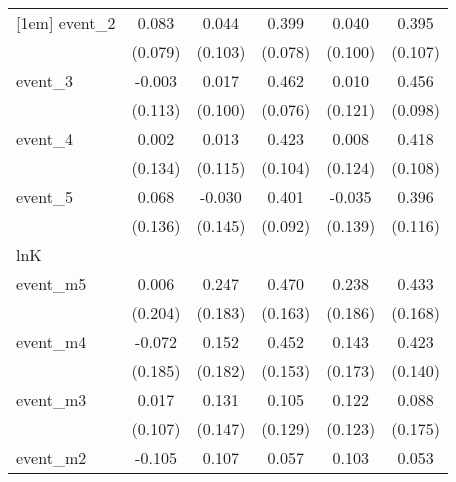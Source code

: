 {\begin{tabular}{l*{5}{c}}
[1em]
event\_2     &       0.083         &       0.044         &       0.399\sym{***}&       0.040         &       0.395\sym{***}\\
            &     (0.079)         &     (0.103)         &     (0.078)         &     (0.100)         &     (0.107)         \\
[1em]
event\_3     &      -0.003         &       0.017         &       0.462\sym{***}&       0.010         &       0.456\sym{***}\\
            &     (0.113)         &     (0.100)         &     (0.076)         &     (0.121)         &     (0.098)         \\
[1em]
event\_4     &       0.002         &       0.013         &       0.423\sym{***}&       0.008         &       0.418\sym{***}\\
            &     (0.134)         &     (0.115)         &     (0.104)         &     (0.124)         &     (0.108)         \\
[1em]
event\_5     &       0.068         &      -0.030         &       0.401\sym{***}&      -0.035         &       0.396\sym{***}\\
            &     (0.136)         &     (0.145)         &     (0.092)         &     (0.139)         &     (0.116)         \\
\hline
lnK         &                     &                     &                     &                     &                     \\
event\_m5    &       0.006         &       0.247         &       0.470\sym{**} &       0.238         &       0.433\sym{*}  \\
            &     (0.204)         &     (0.183)         &     (0.163)         &     (0.186)         &     (0.168)         \\
[1em]
event\_m4    &      -0.072         &       0.152         &       0.452\sym{**} &       0.143         &       0.423\sym{**} \\
            &     (0.185)         &     (0.182)         &     (0.153)         &     (0.173)         &     (0.140)         \\
[1em]
event\_m3    &       0.017         &       0.131         &       0.105         &       0.122         &       0.088         \\
            &     (0.107)         &     (0.147)         &     (0.129)         &     (0.123)         &     (0.175)         \\
[1em]
event\_m2    &      -0.105         &       0.107         &       0.057         &       0.103         &       0.053         \\

\end{tabular}}
